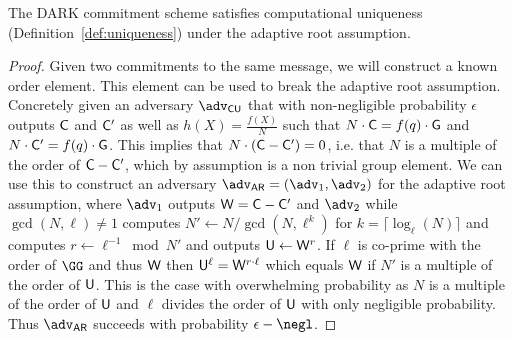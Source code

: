 \begin{lemma} 
The DARK commitment scheme satisfies computational uniqueness (Definition~\ref{def:uniqueness}) under the adaptive root assumption.
\end{lemma}
\begin{proof}

	Given two commitments to the same message, we will construct a known order element. This element can be used to break the adaptive root assumption. Concretely given an adversary $\adv_{\mathsf{CU}}$ that with non-negligible probability $\epsilon$ outputs $\gr{C}$ and $\gr{C}'$ as well as $h(X)=\frac{f(X)}{N}$ such that $N \cdot \gr{C}=f(q)\cdot \Generator$ and $N \cdot \gr{C}'=f(q)\cdot \Generator$. This implies that $N\cdot (\gr{C}-\gr{C}')=0$, i.e. that $N$ is a multiple of the order of $\gr{C}-\gr{C}'$, which by assumption is a non trivial group element. We can use this to construct an adversary $\adv_{\mathsf{AR}}=(\adv_1,\adv_2)$ for the adaptive root assumption, where $\adv_1$ outputs $\gr{W}=\gr{C}-\gr{C}'$ and $\adv_2$ while $\gcd(N,\ell)\neq 1$ computes $N'\gets N/\gcd(N,\ell^k)$ for $k=\lceil \log_\ell(N)\rceil$ and computes $r\gets \ell^{-1}\bmod N'$ and outputs $\gr{U}\gets \gr{W}^r$. If $\ell$ is co-prime with the order of $\GG$ and thus $\gr{W}$ then $\gr{U}^\ell=\gr{W}^{r\cdot \ell}$ which equals $\gr{W}$ if $N'$ is a multiple of the order of $\gr{U}$. This is the case with overwhelming probability as $N$ is a multiple of the order of $\gr{U}$ and $\ell$ divides the order of $\gr{U}$ with only negligible probability. Thus $\adv_{\mathsf{AR}}$ succeeds with probability $\epsilon-\negl$.
		\end{proof}


